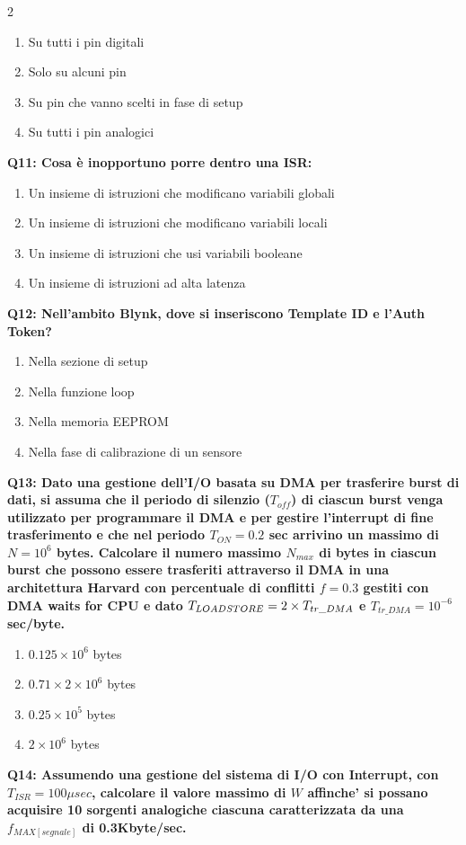 \documentclass[10pt]{article}
\begin{document}
\begin{multicols}{2}
\begin{enumerate}[label=\arabic*.]
\item Su tutti i pin digitali
\item Solo su alcuni pin
\item Su pin che vanno scelti in fase di setup
\item Su tutti i pin analogici
\end{enumerate}
\textbf{Q11: Cosa è inopportuno porre dentro una ISR:}

\begin{enumerate}[label=\arabic*.]
\item Un insieme di istruzioni che modificano variabili globali
\item Un insieme di istruzioni che modificano variabili locali
\item Un insieme di istruzioni che usi variabili booleane
\item Un insieme di istruzioni ad alta latenza
\end{enumerate}
\textbf{Q12: Nell'ambito Blynk, dove si inseriscono Template ID e l’Auth Token?}

\begin{enumerate}[label=\arabic*.]
\item Nella sezione di setup
\item Nella funzione loop
\item Nella memoria EEPROM
\item Nella fase di calibrazione di un sensore
\end{enumerate}
\textbf{Q13: Dato una gestione dell’I/O basata su DMA per trasferire burst di dati, si assuma che il periodo di silenzio  ($T_{off}$) di ciascun burst venga utilizzato per programmare il DMA e per gestire l’interrupt di fine trasferimento e che nel periodo $T_{ON} = 0.2$ sec arrivino un massimo di $N=10^6$ bytes. Calcolare il numero massimo $N_{max}$ di bytes in ciascun burst che possono essere trasferiti attraverso il DMA in una architettura Harvard con percentuale di conflitti $f = 0.3$ gestiti con DMA waits for CPU e dato $T_{LOAD\/STORE} = 2 \times T_{tr\_DMA}$ e $T_{tr\_DMA} = 10^{-6}$ sec/byte.}

\begin{enumerate}[label=\arabic*.]
\item $0.125 \times 10^6$ bytes
\item $0.71 \times 2 \times 10^6$ bytes
\item $0.25 \times 10^5$ bytes
\item $2 \times 10^6$ bytes
\end{enumerate}
\textbf{Q14: Assumendo una gestione del sistema di I/O con Interrupt, con $T_{ISR}=100\mu sec$, calcolare il valore massimo di $W$ affinche' si possano acquisire 10 sorgenti analogiche ciascuna caratterizzata da una $f_{MAX[segnale]}$ di 0.3Kbyte/sec.}


\end{multicols}
\end{document}
